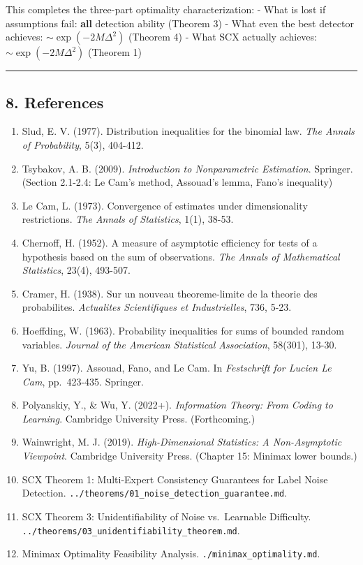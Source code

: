 \documentclass[
  12pt,
]{article}
\begin{document}
This completes the three-part optimality characterization: - What is
lost if assumptions fail: \textbf{all} detection ability (Theorem 3) -
What even the best detector achieves: \(\sim\exp(-2M\Delta^2)\) (Theorem
4) - What SCX actually achieves: \(\sim\exp(-2M\Delta^2)\) (Theorem 1)

\begin{center}\rule{0.5\linewidth}{0.5pt}\end{center}

\subsection{8. References}\label{references}

\begin{enumerate}
\def\labelenumi{\arabic{enumi}.}
\item
  Slud, E. V. (1977). Distribution inequalities for the binomial law.
  \emph{The Annals of Probability}, 5(3), 404-412.
\item
  Tsybakov, A. B. (2009). \emph{Introduction to Nonparametric
  Estimation}. Springer. (Section 2.1-2.4: Le Cam's method, Assouad's
  lemma, Fano's inequality)
\item
  Le Cam, L. (1973). Convergence of estimates under dimensionality
  restrictions. \emph{The Annals of Statistics}, 1(1), 38-53.
\item
  Chernoff, H. (1952). A measure of asymptotic efficiency for tests of a
  hypothesis based on the sum of observations. \emph{The Annals of
  Mathematical Statistics}, 23(4), 493-507.
\item
  Cramer, H. (1938). Sur un nouveau theoreme-limite de la theorie des
  probabilites. \emph{Actualites Scientifiques et Industrielles}, 736,
  5-23.
\item
  Hoeffding, W. (1963). Probability inequalities for sums of bounded
  random variables. \emph{Journal of the American Statistical
  Association}, 58(301), 13-30.
\item
  Yu, B. (1997). Assouad, Fano, and Le Cam. In \emph{Festschrift for
  Lucien Le Cam}, pp.~423-435. Springer.
\item
  Polyanskiy, Y., \& Wu, Y. (2022+). \emph{Information Theory: From
  Coding to Learning}. Cambridge University Press. (Forthcoming.)
\item
  Wainwright, M. J. (2019). \emph{High-Dimensional Statistics: A
  Non-Asymptotic Viewpoint}. Cambridge University Press. (Chapter 15:
  Minimax lower bounds.)
\item
  SCX Theorem 1: Multi-Expert Consistency Guarantees for Label Noise
  Detection. \texttt{../theorems/01\_noise\_detection\_guarantee.md}.
\item
  SCX Theorem 3: Unidentifiability of Noise vs.~Learnable Difficulty.
  \texttt{../theorems/03\_unidentifiability\_theorem.md}.
\item
  Minimax Optimality Feasibility Analysis.
  \texttt{./minimax\_optimality.md}.
\end{enumerate}
\end{document}
